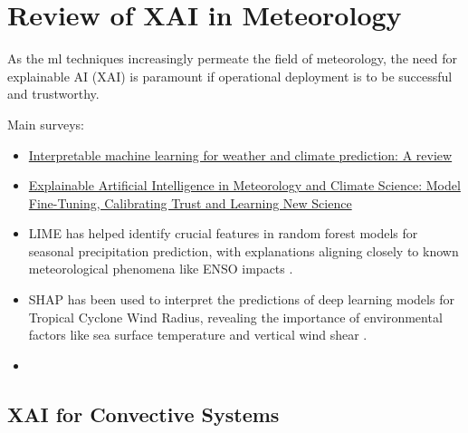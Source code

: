 
\section{Review of XAI in Meteorology}

As the \acrshort{ml} techniques increasingly permeate the field of meteorology, the need for explainable AI (XAI) is paramount if operational deployment is to be successful and trustworthy. 

Main surveys:
\begin{itemize}
    \item \href{https://www.sciencedirect.com/science/article/pii/S1352231024004722}{Interpretable machine learning for weather and climate prediction: A review}
    \item \href{https://link.springer.com/chapter/10.1007/978-3-031-04083-2_16#Sec2}{Explainable Artificial Intelligence in Meteorology and Climate Science: Model Fine-Tuning, Calibrating Trust and Learning New Science}
\end{itemize}

\begin{itemize}
    \item LIME has helped identify crucial features in random forest models for seasonal precipitation prediction, with explanations aligning closely to known meteorological phenomena like ENSO impacts .
    \item SHAP has been used to interpret the predictions of deep learning models for Tropical Cyclone Wind Radius, revealing the importance of environmental factors like sea surface temperature and vertical wind shear .
    \item 
\end{itemize}

\subsection{XAI for Convective Systems}

